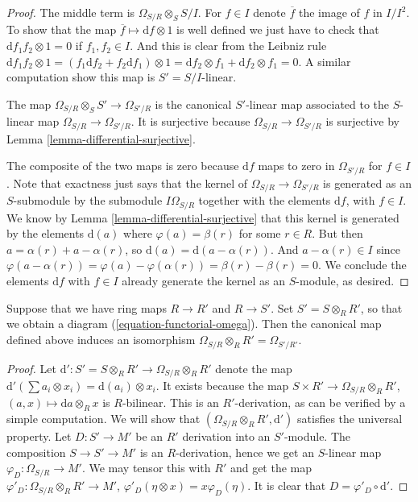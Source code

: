 \begin{proof}
The middle term is $\Omega_{S/R} \otimes_S S/I$.
For $f \in I$ denote $\overline{f}$ the image of $f$ in $I/I^2$.
To show that the map $\overline{f} \mapsto \text{d}f \otimes 1$
is well defined we just have to check that
$\text{d} f_1f_2 \otimes 1 = 0$ if $f_1, f_2 \in I$.
And this is clear from the Leibniz rule
$\text{d} f_1f_2 \otimes 1
=
(f_1 \text{d}f_2 + f_2 \text{d} f_1 )\otimes 1
=
\text{d}f_2 \otimes f_1 + \text{d}f_2 \otimes f_1
=
0$. A similar computation show this map is $S' = S/I$-linear.

\medskip\noindent
The map $\Omega_{S/R}\otimes_S S' \to \Omega_{S'/R}$
is the canonical $S'$-linear map associated to the
$S$-linear map $\Omega_{S/R} \to \Omega_{S'/R}$.
It is surjective because $\Omega_{S/R} \to \Omega_{S'/R}$
is surjective by Lemma \ref{lemma-differential-surjective}.

\medskip\noindent
The composite of the two maps is zero because
$\text{d}f$ maps to zero in $\Omega_{S'/R}$
for $f \in I$. Note that exactness just says that
the kernel of $\Omega_{S/R} \to \Omega_{S'/R}$
is generated as an $S$-submodule by the submodule $I\Omega_{S/R}$ together
with the elements $\text{d}f$, with $f \in I$. We know by
Lemma \ref{lemma-differential-surjective}
that this kernel is generated by the elements $\text{d}(a)$
where $\varphi(a) = \beta(r)$ for some $r \in R$.
But then $a = \alpha(r) + a - \alpha(r)$, so
$\text{d}(a) = \text{d}(a - \alpha(r))$. And
$a - \alpha(r) \in I$ since $\varphi(a - \alpha(r)) =
\varphi(a) - \varphi(\alpha(r)) = \beta(r) - \beta(r) = 0$.
We conclude the elements $\text{d}f$ with $f \in I$ already
generate the kernel as an $S$-module, as desired.
\end{proof}

\begin{lemma}
\label{lemma-differentials-base-change}
Suppose that we have ring maps $R \to R'$ and $R \to S'$.
Set $S' = S\otimes_R R'$, so that we obtain a diagram
(\ref{equation-functorial-omega}). Then the canonical map defined above
induces an isomorphism $\Omega_{S/R} \otimes_R R' = \Omega_{S'/R'}$.
\end{lemma}

\begin{proof}
Let $\text{d}' : S' = S\otimes_R R' \to \Omega_{S/R} \otimes_R R'$ denote the
map $\text{d}'( \sum a_i \otimes x_i ) = \text{d}(a_i) \otimes x_i$.
It exists because the map $S \times R' \to \Omega_{S/R} \otimes_R R'$,
$(a, x)\mapsto \text{d}a\otimes_R x$ is $R$-bilinear.
This is an $R'$-derivation, as can be verified by a simple computation.
We will show that $(\Omega_{S/R} \otimes_R R', \text{d}')$ satisfies
the universal property. Let $D : S' \to M'$ be an $R'$ derivation
into an $S'$-module. The composition $S \to S' \to M'$ is an $R$-derivation,
hence we get an $S$-linear map $\varphi_D : \Omega_{S/R} \to M'$. We may
tensor this with $R'$ and get the map $\varphi'_D :
\Omega_{S/R} \otimes_R R' \to M'$, $\varphi'_D(\eta \otimes x) =
x\varphi_D(\eta)$. It is clear that $D = \varphi'_D \circ \text{d}'$.
\end{proof}

